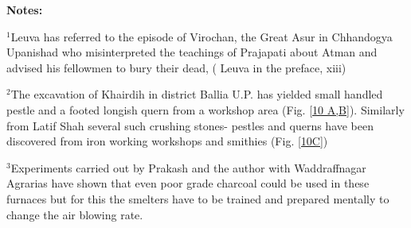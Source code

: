 \noindent \textbf{\large Notes:}

${}^1$Leuva has referred to the episode of Virochan, the Great Asur in Chhandogya Upanishad who misinterpreted the teachings of Prajapati about Atman and advised his fellowmen to bury their dead, ( Leuva in the preface, xiii)

${}^2$The excavation of Khairdih in district Ballia U.P. has yielded small handled pestle and a footed longish quern from a workshop area (Fig. \ref{10 A,B}). Similarly from Latif Shah several such crushing stones- pestles and querns have been discovered from iron working workshops and smithies (Fig. \ref{10C})

${}^3$Experiments carried out by Prakash and the author with Waddraffnagar Agrarias have shown that even poor grade charcoal could be used in these furnaces but for this the smelters have to be trained and prepared mentally to change the air blowing rate.

